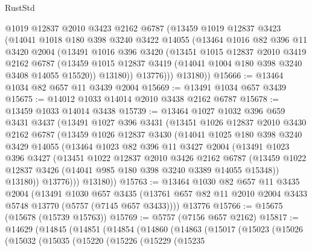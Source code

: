 \begin{lexlean}{RustStd}
\begin{coremodule}
{\begin{coremodule}
{{{{{{{{{{{{{{{{{{{{{{{{{{{{{{{        @1019
        @12837
        @2010
        @3423
        @2162
        @6787
        (@13459
          @1019
          @12837
          @3423
          (@14041
            @1018
            @180
            @398
            @3240
            @3422
            @14055
            (@13464
              @1016
              @82
              @396
              @11
              @3420
              @2004
              (@13491
                @1016
                @396
                @3420
                (@13451
                  @1015
                  @12837
                  @2010
                  @3419
                  @2162
                  @6787
                  (@13459 @1015 @12837 @3419 (@14041 @1004 @180 @398 @3240 @3408 @14055 @15520))
                  @13180))
              @13776)))
        @13180))
@15666 := @13464 @1034 @82 @657 @11 @3439 @2004
@15669 := @13491 @1034 @657 @3439
@15675 := @14012 @1033 @14014 @2010 @3438 @2162 @6787
@15678 := @13459 @1033 @14014 @3438
@15739 := @13464
    @1027
    @1032
    @396
    @659
    @3431
    @3437
    (@13491
      @1027
      @396
      @3431
      (@13451
        @1026
        @12837
        @2010
        @3430
        @2162
        @6787
        (@13459
          @1026
          @12837
          @3430
          (@14041
            @1025
            @180
            @398
            @3240
            @3429
            @14055
            (@13464
              @1023
              @82
              @396
              @11
              @3427
              @2004
              (@13491
                @1023
                @396
                @3427
                (@13451
                  @1022
                  @12837
                  @2010
                  @3426
                  @2162
                  @6787
                  (@13459 @1022 @12837 @3426 (@14041 @985 @180 @398 @3240 @3389 @14055 @15348))
                  @13180))
              @13776)))
        @13180))
@15763 := @13464
    @1030
    @82
    @657
    @11
    @3435
    @2004
    (@13491
      @1030
      @657
      @3435
      (@13761 @657 @82 @11 @2010 @2004 @3433 @5748 @13770 (@5757 (@7145 @657 @3433))))
    @13776
@15766 := @15675 (@15678 (@15739 @15763))
@15769 := @5757 (@7156 @657 @2162)
@15817 := @14629
    (@14845
      (@14851
        (@14854
          (@14860
            (@14863
              (@15017
                (@15023
                  (@15026
                    (@15032
                      (@15035
                        (@15220
                          (@15226
                            (@15229
                              (@15235
}}}}}}}}}}}}}}}}}}}}}}}}}}}}}}}
\end{coremodule}}
\end{coremodule}
\end{lexlean}
